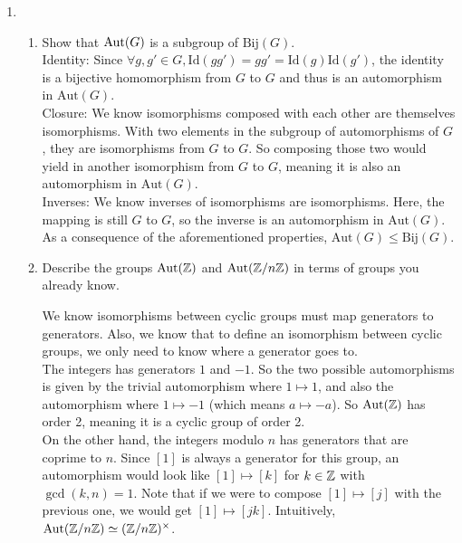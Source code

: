 \documentclass{amsart}
\begin{document}
\begin{enumerate}[itemsep=0.2in]
\item 
\begin{enumerate}
	\item Show that $\operatorname{Aut}(G)$ is a subgroup of $\mathrm{Bij}(G)$.\\

    Identity: Since $\forall g,g'\in G,\mathrm{Id}(gg')=gg'=\mathrm{Id}(g)\mathrm{Id}(g')$, the identity is a bijective homomorphism from $G$ to $G$ and thus is an automorphism in $\mathrm{Aut}(G)$. \\

    Closure: We know isomorphisms composed with each other are themselves isomorphisms. With two elements in the subgroup of automorphisms of $G$, they are isomorphisms from $G$ to $G$. So composing those two would yield in another isomorphism from $G$ to $G$, meaning it is also an automorphism in $\mathrm{Aut}(G)$.\\

    Inverses: We know inverses of isomorphisms are isomorphisms. Here, the mapping is still $G$ to $G$, so the inverse is an automorphism in $\mathrm{Aut}(G)$.\\

    As a consequence of the aforementioned properties, $\mathrm{Aut}(G)\leq\mathrm{Bij}(G)$.\\
    
	\item Describe the groups $\operatorname{Aut}(\mathbb{Z})$ and $\operatorname{Aut}(\mathbb{Z}/n\mathbb{Z})$ in terms of groups you already know.

    We know isomorphisms between cyclic groups must map generators to generators. Also, we know that to define an isomorphism between cyclic groups, we only need to know where a generator goes to. \\

    The integers has generators $1$ and $-1$. So the two possible automorphisms is given by the trivial automorphism where $1\mapsto1$, and also the automorphism where $1\mapsto-1$ (which means $a\mapsto-a$). So $\mathrm{Aut}(\mathbb{Z})$ has order 2, meaning it is a cyclic group of order 2. \\

    On the other hand, the integers modulo $n$ has generators that are coprime to $n$. Since $[1]$ is always a generator for this group, an automorphism would look like $[1]\mapsto[k]$ for $k\in\mathbb{Z}$ with $\gcd(k,n)=1$. Note that if we were to compose $[1]\mapsto[j]$ with the previous one, we would get $[1]\mapsto[jk]$. Intuitively, $\mathrm{Aut}(\mathbb{Z}/n\mathbb{Z})\simeq(\mathbb{Z}/n\mathbb{Z})^\times$.


\end{enumerate}
\end{enumerate}
\end{document}

